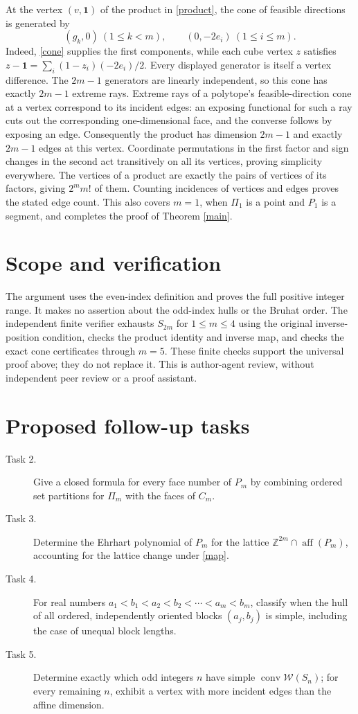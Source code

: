 \documentclass[11pt]{article}
\newcommand{\conv}{\operatorname{conv}}
\newcommand{\W}{\mathcal W}
\begin{document}
At the vertex $(v,\mathbf1)$ of the product in \eqref{product}, the cone
of feasible directions is generated by
\[
 (g_k,0)\ (1\leq k<m),\qquad (0,-2e_i)\ (1\leq i\leq m).
\]
Indeed, \eqref{cone} supplies the first components, while each cube vertex
$z$ satisfies $z-\mathbf1=\sum_i(1-z_i)(-2e_i)/2$.
Every displayed generator is itself a vertex difference. The $2m-1$
generators are linearly independent, so this cone has exactly $2m-1$
extreme rays. Extreme rays of a polytope's feasible-direction cone at
a vertex correspond to its incident edges: an exposing functional for
such a ray cuts out the corresponding one-dimensional face, and the
converse follows by exposing an edge.
Consequently the product has dimension $2m-1$ and exactly $2m-1$ edges
at this vertex. Coordinate permutations in the first factor and sign
changes in the second act transitively on all its vertices, proving
simplicity everywhere. The vertices of a product are exactly the pairs
of vertices of its factors, giving $2^m m!$ of them. Counting incidences
of vertices and edges proves the stated edge count. This also covers
$m=1$, when $\Pi_1$ is a point and $P_1$ is a segment, and completes
the proof of Theorem \ref{main}.

\section*{Scope and verification}
The argument uses the even-index definition and proves the full positive
integer range. It makes no assertion about the odd-index hulls or the
Bruhat order. The independent finite verifier exhausts $S_{2m}$ for
$1\leq m\leq4$ using the original inverse-position condition, checks
the product identity and inverse map, and checks the exact cone
certificates through $m=5$. These finite checks support the universal
proof above; they do not replace it. This is author-agent review,
without independent peer review or a proof assistant.

\section*{Proposed follow-up tasks}
\begin{description}
\item[Task 2.] Give a closed formula for every face number of $P_m$ by
combining ordered set partitions for $\Pi_m$ with the faces of $C_m$.
\item[Task 3.] Determine the Ehrhart polynomial of $P_m$ for the lattice
$\mathbb Z^{2m}\cap\operatorname{aff}(P_m)$, accounting for the lattice
change under \eqref{map}.
\item[Task 4.] For real numbers $a_1<b_1<a_2<b_2<\cdots<a_m<b_m$,
classify when the hull of all ordered, independently oriented blocks
$(a_j,b_j)$ is simple, including the case of unequal block lengths.
\item[Task 5.] Determine exactly which odd integers $n$ have simple
$\conv\W(S_n)$; for every remaining $n$, exhibit a vertex with more
incident edges than the affine dimension.
\end{description}
\end{document}
